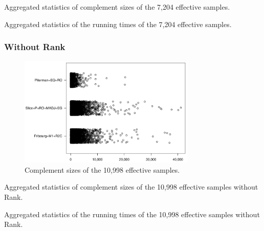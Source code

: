 \begin{table}[ht]
\centering

\caption{Aggregated statistics of complement sizes of the 7,204 effective samples.}
\end{table}

\begin{table}[ht]
\centering

\caption{Aggregated statistics of the running times of the 7,204 effective samples.}
\end{table}


\subsubsection{Without Rank}


\begin{figure}[ht]
\centering
\includegraphics[width=0.75\textwidth]{figures/r/external/goal/s.stripchart.pdf}
\caption{Complement sizes of the 10,998  effective samples.}
\end{figure}


\begin{table}[ht]
\centering

\caption{Aggregated statistics of complement sizes of the 10,998 effective samples without Rank.}
\end{table}

\begin{table}[ht]
\centering

\caption{Aggregated statistics of the running times of the 10,998 effective samples without Rank.}
\end{table}

\renewcommand{\perspwidth}{0.3}

